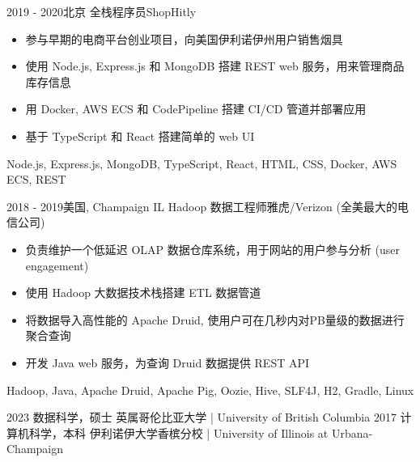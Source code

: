 \documentclass[alternative]{resume_template}
\begin{document}
\begin{experiences}
    \experience
    {2019 - 2020}{北京}
    {全栈程序员}{ShopHitly}
    {
        \begin{itemize}
        \item 参与早期的电商平台创业项目，向美国伊利诺伊州用户销售烟具
        \item 使用 Node.js, Express.js 和 MongoDB 搭建 REST web 服务，用来管理商品库存信息
        \item 用 Docker, AWS ECS 和 CodePipeline 搭建 CI/CD 管道并部署应用
        \item 基于 TypeScript 和 React 搭建简单的 web UI
        \end{itemize}
    }
    {Node.js, Express.js, MongoDB, TypeScript, React, HTML, CSS, Docker, AWS ECS, REST}
    
    \experience
    {2018 - 2019}{美国, Champaign IL}
    {Hadoop 数据工程师}{雅虎/Verizon (全美最大的电信公司)}
    {
        \begin{itemize}
        \item 负责维护一个低延迟 OLAP 数据仓库系统，用于网站的用户参与分析 (user engagement)
        \item 使用 Hadoop 大数据技术栈搭建 ETL 数据管道
        \item 将数据导入高性能的 Apache Druid, 使用户可在几秒内对PB量级的数据进行聚合查询
        \item 开发 Java web 服务，为查询 Druid 数据提供 REST API
        \end{itemize}
    }
    {Hadoop, Java, Apache Druid, Apache Pig, Oozie, Hive, SLF4J, H2, Gradle, Linux}
    
    \end{experiences}

    \begin{experiences}
    \degree
    {2023}
    {数据科学，硕士}
    {英属哥伦比亚大学 | University of British Columbia}
    \vspace{5pt}
    \degree
    {2017}
    {计算机科学，本科}
    {伊利诺伊大学香槟分校 | University of Illinois at Urbana-Champaign}
    \end{experiences}
\end{document}
